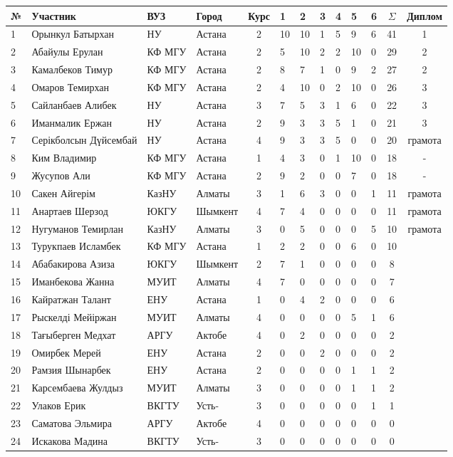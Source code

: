 \begin{tabular}{|l|l|l|p{2.2cm}|c|*{6}{p{0.3cm}|}c|c|}
\hline
№ & Участник & ВУЗ & Город & Курс & 1 & 2 & 3 & 4 & 5 & 6 & $\Sigma$ & Диплом\\
\hline
1 & Орынкул Батырхан & НУ & Астана & 2 & 10 & 10 & 1 & 5 & 9 & 6 & 41 & 1\\
\hline
2 & Абайулы Ерулан & КФ МГУ  & Астана & 2 & 5 & 10 & 2 & 2 & 10 & 0 & 29 & 2\\
\hline
3 & Камалбеков Тимур & КФ МГУ  & Астана & 2 & 8 & 7 & 1 & 0 & 9 & 2 & 27 & 2\\
\hline
4 & Омаров Темирхан & КФ МГУ  & Астана & 2 & 4 & 10 & 0 & 2 & 10 & 0 & 26 & 3\\
\hline
5 & Сайланбаев Алибек & НУ  & Астана & 3 & 7 & 5 & 3 & 1 & 6 & 0 & 22 & 3\\
\hline
6 & Иманмалик Ержан & НУ  & Астана & 2 & 9 & 3 & 3 & 5 & 1 & 0 & 21 & 3\\
\hline
7 & Серікболсын Дүйсембай & НУ  & Астана & 4 & 9 & 3 & 3 & 5 & 0 & 0 & 20 & грамота\\
\hline
8 & Ким Владимир & КФ МГУ  & Астана & 1 & 4 & 3 & 0 & 1 & 10 & 0 & 18 & -\\
\hline
9 & Жусупов Али & КФ МГУ  & Астана & 2 & 9 & 2 & 0 & 0 & 7 & 0 & 18 & -\\
\hline
10 & Сакен Айгерім & КазНУ  & Алматы & 3 & 1 & 6 & 3 & 0 & 0 & 1 & 11 & грамота\\
\hline
11 & Анартаев Шерзод & ЮКГУ  & Шымкент & 4 & 7 & 4 & 0 & 0 & 0 & 0 & 11 & грамота\\
\hline
12 & Нугуманов Темирлан & КазНУ  & Алматы & 3 & 0 & 5 & 0 & 0 & 0 & 5 & 10 & грамота\\
\hline
13 & Турукпаев Исламбек & КФ МГУ  & Астана & 1 & 2 & 2 & 0 & 0 & 6 & 0 & 10 & \\
\hline
14 & Абабакирова Азиза & ЮКГУ  & Шымкент & 2 & 7 & 1 & 0 & 0 & 0 & 0 & 8 & \\
\hline
15 & Иманбекова Жанна & МУИТ  & Алматы & 4 & 7 & 0 & 0 & 0 & 0 & 0 & 7 & \\
\hline
16 & Кайратжан Талант & ЕНУ  & Астана & 1 & 0 & 4 & 2 & 0 & 0 & 0 & 6 & \\
\hline
17 & Рыскелді Мейіржан & МУИТ  & Алматы & 4 & 0 & 0 & 0 & 0 & 5 & 1 & 6 & \\
\hline
18 & Тағыберген Медхат & АРГУ  & Актобе & 4 & 0 & 2 & 0 & 0 & 0 & 0 & 2 & \\
\hline
19 & Омирбек Мерей & ЕНУ  & Астана & 2 & 0 & 0 & 2 & 0 & 0 & 0 & 2 & \\
\hline
20 & Рамзия Шынарбек & ЕНУ  & Астана & 2 & 0 & 0 & 0 & 0 & 1 & 1 & 2 & \\
\hline
21 & Карсембаева Жулдыз & МУИТ  & Алматы & 3 & 0 & 0 & 0 & 0 & 1 & 1 & 2 & \\
\hline
22 & Улаков Ерик & ВКГТУ  &  Усть- & 3 & 0 & 0 & 0 & 0 & 0 & 1 & 1 & \\
\hline
23 & Саматова Эльмира & АРГУ  & Актобе & 4 & 0 & 0 & 0 & 0 & 0 & 0 & 0 & \\
\hline
24 & Искакова Мадина & ВКГТУ  & Усть- & 3 & 0 & 0 & 0 & 0 & 0 & 0 & 0 & \\
\hline
\end{tabular}

